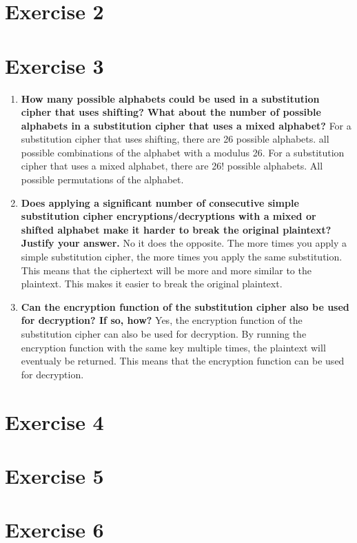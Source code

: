 \documentclass{report}
\begin{document}
\section*{Exercise 2}

\section*{Exercise 3}

\begin{enumerate}
      \item \textbf{How many possible alphabets could be used in a substitution cipher that uses shifting? What about the number of possible alphabets in a substitution cipher that uses a mixed alphabet?}
            For a substitution cipher that uses shifting, there are 26 possible alphabets. all possible combinations of the alphabet with a modulus 26.
            For a substitution cipher that uses a mixed alphabet, there are 26! possible alphabets. All possible permutations of the alphabet.

      \item \textbf{Does applying a significant number of consecutive simple substitution cipher encryptions/decryptions with a mixed or shifted alphabet make it harder to break the original plaintext? Justify your answer.}
            No it does the opposite. The more times you apply a simple substitution cipher, the more times you apply the same substitution. This means that the ciphertext will be more and more similar to the plaintext. This makes it easier to break the original plaintext.

      \item \textbf{Can the encryption function of the substitution cipher also be used for decryption? If so, how?}
            Yes, the encryption function of the substitution cipher can also be used for decryption. By running the encryption function with the same key multiple times, the plaintext will eventualy be returned.
            This means that the encryption function can be used for decryption.

\end{enumerate}

\section*{Exercise 4}

\section*{Exercise 5}

\section*{Exercise 6}
\end{document}
